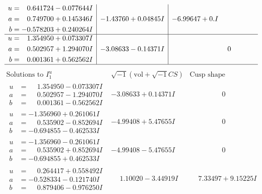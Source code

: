 \documentclass[1p]{elsarticle_modified}
\theoremstyle{definition}
\newcommand{\I}{\sqrt{-1}}
\begin{document}
$$\begin{array}{c|c|c}
\begin{aligned}
u &= \phantom{-}0.641724 - 0.077644 I \\
a &= \phantom{-}0.749700 + 0.145346 I \\
b &= -0.578203 + 0.240264 I\end{aligned}
 & -1.43760 + 0.04845 I & -6.99647 + 0. I\phantom{ +0.000000I} \\ \hline\begin{aligned}
u &= \phantom{-}1.354950 + 0.073307 I \\
a &= \phantom{-}0.502957 + 1.294070 I \\
b &= \phantom{-}0.001361 + 0.562562 I\end{aligned}
 & -3.08633 - 0.14371 I & \phantom{-0.000000 } 0\\
 \hline 
 \end{array}$$\newpage$$\begin{array}{c|c|c}  
\text{Solutions to }I^u_{1}& \I (\text{vol} + \sqrt{-1}CS) & \text{Cusp shape}\\
 \hline 
\begin{aligned}
u &= \phantom{-}1.354950 - 0.073307 I \\
a &= \phantom{-}0.502957 - 1.294070 I \\
b &= \phantom{-}0.001361 - 0.562562 I\end{aligned}
 & -3.08633 + 0.14371 I & \phantom{-0.000000 } 0 \\ \hline\begin{aligned}
u &= -1.356960 + 0.261061 I \\
a &= \phantom{-}0.535902 - 0.852694 I \\
b &= -0.694855 - 0.462533 I\end{aligned}
 & -4.99408 + 5.47655 I & \phantom{-0.000000 } 0 \\ \hline\begin{aligned}
u &= -1.356960 - 0.261061 I \\
a &= \phantom{-}0.535902 + 0.852694 I \\
b &= -0.694855 + 0.462533 I\end{aligned}
 & -4.99408 - 5.47655 I & \phantom{-0.000000 } 0 \\ \hline\begin{aligned}
u &= \phantom{-}0.264417 + 0.558492 I \\
a &= -0.528334 - 0.121740 I \\
b &= \phantom{-}0.879406 - 0.976250 I\end{aligned}
 & \phantom{-}1.10020 - 3.44919 I & \phantom{-}7.33497 + 9.15225 I \\ \hline\begin{aligned}

\end{aligned}
\end{array}$$
\end{document}
